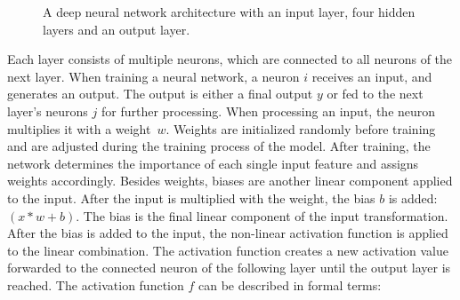 \begin{figure}[H]
\caption[A DNN architecture with multiple layers]{A deep neural network architecture with an input layer, four hidden layers and an output layer.}
\label{fig:DNN}
\end{figure}
Each layer consists of multiple neurons, which are connected to all neurons of the next layer. When training a neural network, a neuron $i$ receives an input, and generates an output. The output is either a final output $y$ or fed to the next layer's neurons $j$ for further processing. When processing an input, the neuron multiplies it with a weight~$w$. Weights are initialized randomly before training and are adjusted during the training process of the model. After training, the network determines the importance of each single input feature and assigns weights accordingly. Besides weights, biases are another linear component applied to the input. After the input is multiplied with the weight, the bias $b$ is added: $(x*w+b)$.
The bias is the final linear component of the input transformation. After the bias is added to the input, the non-linear activation function is applied to the linear combination. The activation function creates a new activation value forwarded to the connected neuron of the following layer until the output layer is reached. The activation function $f$ can be described in formal terms: 
